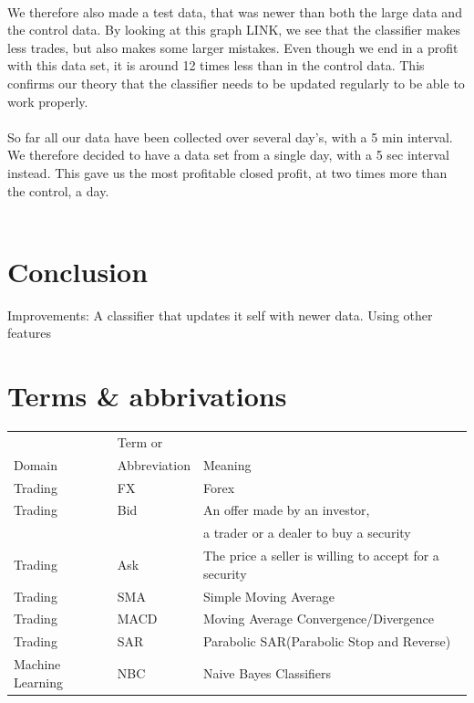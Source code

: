 \documentclass[10pt]{IEEEtran}
\begin{document}
\\
We therefore also made a test data, that was newer than both the large data and the control data. By looking at this graph LINK, we see that the classifier makes less trades, but also makes some larger mistakes. Even though we end in a profit with this data set, it is around 12 times less than in the control data. This confirms our theory that the classifier needs to be updated regularly to be able to work properly.
\\
\\
So far all our data have been collected over several day's, with a 5 min interval. We therefore decided to have a data set from a single day, with a 5 sec interval instead. This gave us the most profitable closed profit, at two times more than the control, a day.\\
\\

\section{Conclusion}


Improvements:
A classifier that updates it self with newer data.
Using other features

\section{Terms \& abbrivations}
\begin{tabular}{l | l | l}
& Term or &\\
Domain & Abbreviation & Meaning\\
\hline
Trading & FX & Forex \\ 
Trading & Bid & An offer made by an investor,\\
& & a trader or a dealer to buy a security\\
Trading & Ask & The price a seller is willing to accept for a security\\
Trading & SMA & Simple Moving Average\\
Trading & MACD & Moving Average Convergence/Divergence\\
Trading & SAR & Parabolic SAR(Parabolic Stop and Reverse)\\
Machine Learning & NBC & Naive Bayes Classifiers\\
\end{tabular}




\end{document}
